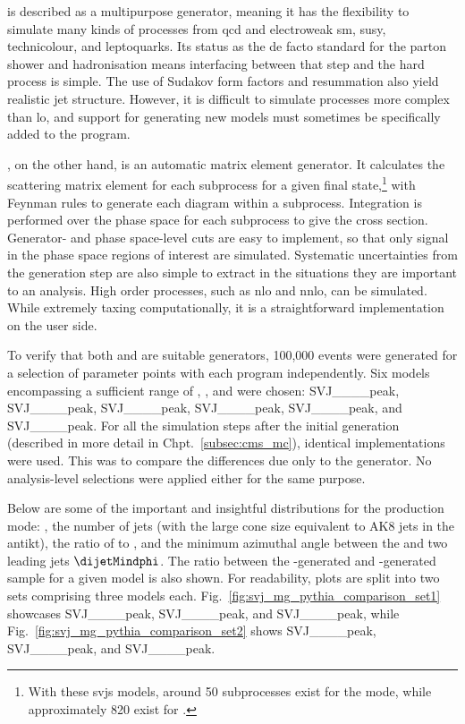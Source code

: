
\PYTHIAEIGHT is described as a multipurpose generator, meaning it has the flexibility to simulate many kinds of processes from \acrshort{qcd} and electroweak \acrshort{sm}, \acrshort{susy}, technicolour, and leptoquarks. Its status as the de facto standard for the parton shower and hadronisation means interfacing between that step and the hard process is simple. The use of Sudakov form factors and resummation also yield realistic jet structure. However, it is difficult to simulate processes more complex than \acrshort{lo}, and support for generating new models must sometimes be specifically added to the program.

\MGvATNLO, on the other hand, is an automatic matrix element generator. It calculates the scattering matrix element for each subprocess for a given final state,\footnote{With these \glspl{svj} models, around 50 subprocesses exist for the \schannel mode, while approximately 820 exist for \tchannel.} with Feynman rules to generate each diagram within a subprocess. Integration is performed over the phase space for each subprocess to give the cross section. Generator- and phase space-level cuts are easy to implement, so that only signal in the phase space regions of interest are simulated. Systematic uncertainties from the generation step are also simple to extract in the situations they are important to an analysis. High order processes, such as \acrshort{nlo} and \acrshort{nnlo}, can be simulated. While extremely taxing computationally, it is a straightforward implementation on the user side.

To verify that both \PYTHIA and \MADGRAPH are suitable generators, 100,000 events were generated for a selection of parameter points with each program independently. Six models encompassing a sufficient range of \mZprime, \mDark, and \rinv were chosen: SVJ\_\_\_\_\-peak, SVJ\_\_\_\_peak, SVJ\_\_\_\_\-peak, SVJ\_\_\_\_\-peak, SVJ\_\_\_\_\-peak, and SVJ\_\_\_\_\-peak. For all the simulation steps after the initial generation (described in more detail in Chpt.~\ref{subsec:cms_mc}), identical implementations were used. This was to compare the differences due only to the generator. No analysis-level selections were applied either for the same purpose.

Below are some of the important and insightful distributions for the \schannel production mode: \mT, the number of \glspl{jet} (with the large cone size equivalent to AK8 \glspl{jet} in the \gls{antikt}), the ratio of \ptmiss to \mT, and the minimum azimuthal angle between the \ptmiss and two leading \glspl{jet} $\dijetMindphi$. The ratio between the \MADGRAPH-generated and \PYTHIA-generated sample for a given model is also shown. For readability, plots are split into two sets comprising three models each. Fig.~\ref{fig:svj_mg_pythia_comparison_set1} showcases SVJ\_\_\_\_\-peak, SVJ\_\_\_\_\-peak, and SVJ\_\_\_\_\-peak, while Fig.~\ref{fig:svj_mg_pythia_comparison_set2} shows SVJ\_\_\_\_\-peak, SVJ\_\_\_\_\-peak, and SVJ\_\_\_\_\-peak.

